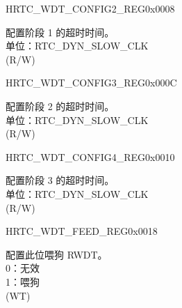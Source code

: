 \begin{register}{H}{RTC\_WDT\_CONFIG2\_REG}{0x0008}\label{regdesc:RTCWDTCONFIG2REG}
%
\regnewline%
\begin{regdesc}\begin{reglist}
\label{fielddesc:RTCWDTSTG1HOLD}\item [RTC\_WDT\_STG1\_HOLD] 配置阶段 1 的超时时间。\\
单位：RTC\_DYN\_SLOW\_CLK  \\ (R/W)
\end{reglist}\end{regdesc}
\end{register}


\begin{register}{H}{RTC\_WDT\_CONFIG3\_REG}{0x000C}\label{regdesc:RTCWDTCONFIG3REG}
%
\regnewline%
\begin{regdesc}\begin{reglist}
\label{fielddesc:RTCWDTSTG2HOLD}\item [RTC\_WDT\_STG2\_HOLD] 配置阶段 2 的超时时间。\\
单位：RTC\_DYN\_SLOW\_CLK  \\ (R/W)
\end{reglist}\end{regdesc}
\end{register}


\begin{register}{H}{RTC\_WDT\_CONFIG4\_REG}{0x0010}\label{regdesc:RTCWDTCONFIG4REG}
%
\regnewline%
\begin{regdesc}\begin{reglist}
\label{fielddesc:RTCWDTSTG3HOLD}\item [RTC\_WDT\_STG3\_HOLD] 配置阶段 3 的超时时间。\\
单位：RTC\_DYN\_SLOW\_CLK  \\ (R/W)
\end{reglist}\end{regdesc}
\end{register}


\begin{register}{H}{RTC\_WDT\_FEED\_REG}{0x0018}\label{regdesc:RTCWDTFEEDREG}
%
%
\regnewline%
\begin{regdesc}\begin{reglist}
\label{fielddesc:RTCWDTRTCWDTFEED}\item [RTC\_WDT\_FEED] 配置此位喂狗 RWDT。\\
0：无效 \\
1：喂狗  \\ (WT)
\end{reglist}\end{regdesc}
\end{register}


